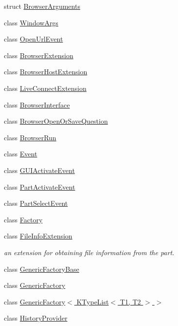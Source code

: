 \begin{DoxyCompactItemize}
\item 
struct \hyperlink{structKParts_1_1BrowserArguments}{\-Browser\-Arguments}
\item 
class \hyperlink{classKParts_1_1WindowArgs}{\-Window\-Args}
\item 
class \hyperlink{classKParts_1_1OpenUrlEvent}{\-Open\-Url\-Event}
\item 
class \hyperlink{classKParts_1_1BrowserExtension}{\-Browser\-Extension}
\item 
class \hyperlink{classKParts_1_1BrowserHostExtension}{\-Browser\-Host\-Extension}
\item 
class \hyperlink{classKParts_1_1LiveConnectExtension}{\-Live\-Connect\-Extension}
\item 
class \hyperlink{classKParts_1_1BrowserInterface}{\-Browser\-Interface}
\item 
class \hyperlink{classKParts_1_1BrowserOpenOrSaveQuestion}{\-Browser\-Open\-Or\-Save\-Question}
\item 
class \hyperlink{classKParts_1_1BrowserRun}{\-Browser\-Run}
\item 
class \hyperlink{classKParts_1_1Event}{\-Event}
\item 
class \hyperlink{classKParts_1_1GUIActivateEvent}{\-G\-U\-I\-Activate\-Event}
\item 
class \hyperlink{classKParts_1_1PartActivateEvent}{\-Part\-Activate\-Event}
\item 
class \hyperlink{classKParts_1_1PartSelectEvent}{\-Part\-Select\-Event}
\item 
class \hyperlink{classKParts_1_1Factory}{\-Factory}
\item 
class \hyperlink{classKParts_1_1FileInfoExtension}{\-File\-Info\-Extension}
\begin{DoxyCompactList}\small\item\em an extension for obtaining file information from the part. \end{DoxyCompactList}\item 
class \hyperlink{classKParts_1_1GenericFactoryBase}{\-Generic\-Factory\-Base}
\item 
class \hyperlink{classKParts_1_1GenericFactory}{\-Generic\-Factory}
\item 
class \hyperlink{classKParts_1_1GenericFactory_3_01KTypeList_3_01T1_00_01T2_01_4_01_4}{\-Generic\-Factory$<$ K\-Type\-List$<$ T1, T2 $>$ $>$}
\item 
class \hyperlink{classKParts_1_1HistoryProvider}{\-History\-Provider}

\end{DoxyCompactItemize}
